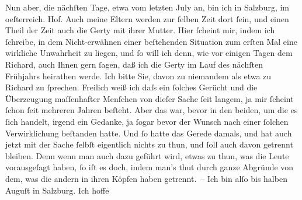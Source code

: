 \begin{ledgroupsized}[t]{13cm}
           \pstart
           Nun aber, die nächſten Tage, etwa vom letzten July an, bin ich in Salzburg, im oeſterreich.
                  Hof. Auch meine Eltern werden zur ſelben Zeit dort ſein, und einen Theil der Zeit auch die
                  {\pb}Gerty mit ihrer Mutter.\pend
           \pstart
           Hier ſcheint mir, indem ich ſchreibe, in dem Nicht-erwähnen einer beſtehenden
               Situation zum erſten Mal eine wirkliche Unwahrheit zu liegen, und ſo will ich denn,
               wie vor einigen Tagen dem Richard, auch Ihnen
               gern ſagen, daß ich die Gerty im Lauf des nächſten
               Frühjahrs heirathen werde. Ich bitte Sie, davon zu niemandem als etwa {\pb}zu Richard zu ſprechen. Freilich weiß ich daſs ein ſolches Gerücht und die
               Überzeugung maſſenhafter Menſchen von dieſer Sache ſeit langem, ja mir ſcheint ſchon
               ſeit mehreren Jahren beſteht. Aber das war, bevor in den beiden, um die es ſich
               handelt, irgend ein Gedanke, ja ſogar bevor der Wunsch nach einer ſolchen
               Verwirklichung beſtanden hatte. Und ſo hatte das Gerede damals, und hat auch jetzt
                  {\pb}mit der Sache ſelbſt
               eigentlich nichts zu thun, und ſoll auch davon getrennt bleiben. Denn wenn man auch
               dazu geführt wird, etwas zu thun, was die Leute vorausgeſagt haben, ſo iſt es doch,
               indem man’s thut durch ganze Abgründe von dem, was die andern in ihren Köpfen haben
               getrennt. – Ich bin alſo bis {\pb}halben Auguſt in Salzburg. Ich hoffe

\end{ledgroupsized}
